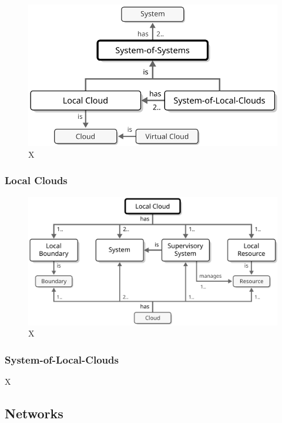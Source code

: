 \begin{figure}[ht!]
  \centering
  \includegraphics{figures/system-of-systems}
  \caption{
    X
  }
  \label{fig:system-of-systems}
\end{figure}

\subsubsection{Local Clouds}

\begin{figure}[ht!]
  \centering
  \includegraphics{figures/local-cloud}
  \caption{
    X
  }
  \label{fig:local-cloud}
\end{figure}

\subsubsection{System-of-Local-Clouds}

X

\subsection{Networks}


